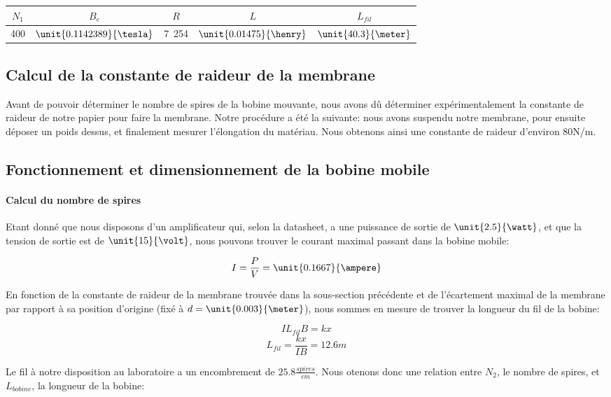 \begin{center}
	\begin{tabular}{c|c|c|c|c}
		$N_1$ & $B_e$ & $R$ & $L$ & $L_{fil}$ \\
		\hline
		400 & $\unit{0.1142389}{\tesla}$ & \unit{7.254}{\ohm} & $\unit{0.01475}{\henry}$ & $\unit{40.3}{\meter}$\\
	\end{tabular}
\end{center}

\subsection{Calcul de la constante de raideur de la membrane}
Avant de pouvoir déterminer le nombre de spires de la bobine mouvante, nous avons dû déterminer
expérimentalement la constante de raideur de notre papier pour faire la membrane.
Notre procédure a été la suivante: nous avons suspendu notre membrane, pour ensuite 
déposer un poids dessus, et finalement mesurer l'élongation du matériau.
Nous obtenons ainsi une constante de raideur d'environ \unit {80}{N/m}.

\subsection{Fonctionnement et dimensionnement de la bobine mobile}

\paragraph{Calcul du nombre de spires}
Etant donné que nous disposons d'un amplificateur qui, selon la datasheet, a une puissance de sortie de 
$\unit{2.5}{\watt}$, et que la tension de sortie est de $\unit{15}{\volt}$, nous pouvons trouver le courant
maximal passant dans la bobine mobile:

$$I = \frac{P}{V} = \unit{0.1667}{\ampere}$$

En fonction de la constante de raideur de la membrane trouvée dans la sous-section précédente et de l'écartement
maximal de la membrane par rapport à sa position d'origine (fixé à $d = \unit{0.003}{\meter}$), nous sommes en
mesure de trouver la longueur du fil de la bobine:

$$IL_{fil}B = kx$$
$$L_{fil} = \frac{kx}{IB} = 12.6 m$$

Le fil à notre disposition au laboratoire a un encombrement de $\unit{25.8}{\frac{spires}{cm}}$. Nous otenons 
donc une relation entre $N_2$, le nombre de spires, et $L_{bobine}$, la longueur de la bobine:

